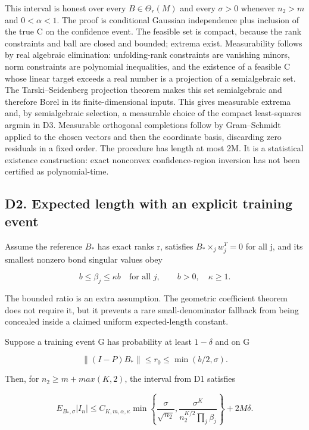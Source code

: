 \documentclass[
  11pt,
]{article}
\begin{document}
This interval is honest over every \(B\in \Theta _r(M)\) and every
\(\sigma >0\) whenever \(n_2>m\) and \(0<\alpha <1\). The proof is
conditional Gaussian independence plus inclusion of the true C on the
confidence event. The feasible set is compact, because the rank
constraints and ball are closed and bounded; extrema exist.
Measurability follows by real algebraic elimination: unfolding-rank
constraints are vanishing minors, norm constraints are polynomial
inequalities, and the existence of a feasible C whose linear target
exceeds a real number is a projection of a semialgebraic set. The
Tarski--Seidenberg projection theorem makes this set semialgebraic and
therefore Borel in its finite-dimensional inputs. This gives measurable
extrema and, by semialgebraic selection, a measurable choice of the
compact least-squares argmin in D3. Measurable orthogonal completions
follow by Gram--Schmidt applied to the chosen vectors and then the
coordinate basis, discarding zero residuals in a fixed order. The
procedure has length at most 2M. It is a statistical existence
construction: exact nonconvex confidence-region inversion has not been
certified as polynomial-time.

\subsection{D2. Expected length with an explicit training
event}\label{d2.-expected-length-with-an-explicit-training-event}

Assume the reference \(B_*\) has exact ranks r, satisfies
\(B_*\times _jw_j^T=0\) for all j, and its smallest nonzero bond
singular values obey

\[
 b\le\beta_j\le\kappa b\quad\text{for all }j,
 \qquad b>0,\quad\kappa\ge1.
\]

The bounded ratio is an extra assumption. The geometric coefficient
theorem does not require it, but it prevents a rare small-denominator
fallback from being concealed inside a claimed uniform expected-length
constant.

Suppose a training event G has probability at least \(1-\delta\) and on
G

\[
 \|(I-P)B_*\|\le r_0\le\min(b/2,\sigma).
\]

Then, for \(n_2\ge m+max(K,2)\), the interval from D1 satisfies

\[
 E_{B_*,\sigma}|I_n|
 \le C_{K,m,\alpha,\kappa}
 \min\left\{\frac\sigma{\sqrt{n_2}},
 \frac{\sigma^K}{n_2^{K/2}\prod_j\beta_j}\right\}
       +2M\delta. \tag{D1}
\]
\end{document}
